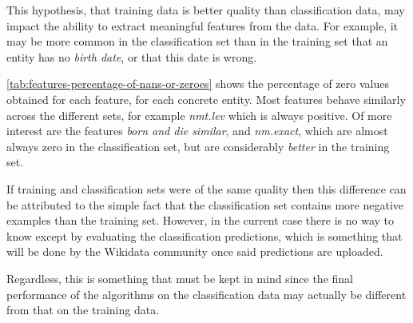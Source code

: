 \documentclass[epsfig,a4paper,11pt,titlepage,twoside,openany]{book}
\begin{document}
This hypothesis, that training data is better quality than classification data, may impact the ability to extract meaningful features from the data. For example, it may be more common in the classification set than in the training set that an entity has no \textit{birth date}, or that this date is wrong.

\autoref{tab:features-percentage-of-nans-or-zeroes} shows the percentage of zero values obtained for each feature, for each concrete entity. Most features behave similarly across the different sets, for example \textit{nmt.lev} which is always positive. Of more interest are the features \textit{born and die similar}, and \textit{nm.exact}, which are almost always zero in the classification set, but are considerably \textit{better} in the training set.

If training and classification sets were of the same quality then this difference can be attributed to the simple fact that the classification set contains more negative examples than the training set. However, in the current case there is no way to know except by evaluating the classification predictions, which is something that will be done by the Wikidata community once said predictions are uploaded. 

Regardless, this is something that must be kept in mind since the final performance of the algorithms on the classification data may actually be different from that on the training data. 
\end{document}
